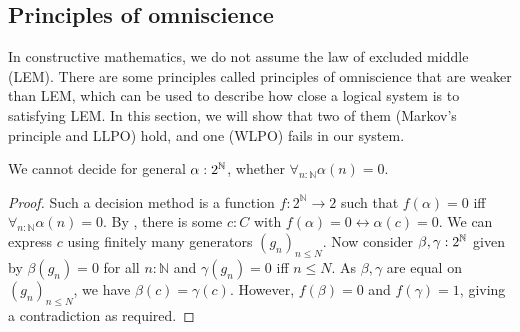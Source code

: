 \subsection{Principles of omniscience}
In constructive mathematics, we do not assume the law of excluded middle (LEM).
There are some principles called principles of omniscience that are weaker than LEM, which can be used to describe 
how close a logical system is to satisfying LEM.
In this section, we will show that two of them (Markov's principle and LLPO) hold, 
and one (WLPO) fails in our system.

\begin{theorem}\label{NotWLPO}
  We cannot decide for general $\alpha:2^{\mathbb{N}}$, whether $\forall_{n:\mathbb N} \alpha(n) = 0$.
\end{theorem}
\begin{proof}
  Such a decision method is a function $f:2^\mathbb N \to 2$ such that 
  $f(\alpha) = 0$ iff $\forall_{n:\mathbb N} \alpha (n)= 0$. 
  By , there is some $c:C$ with 
  $f(\alpha) = 0 \leftrightarrow \alpha(c) = 0$. 
  We can express $c$ using finitely many generators $(g_n)_{n\leq N}$. 
  Now consider $\beta,\gamma:2^{\mathbb{N}}$ given by 
  $\beta(g_n) = 0$ for all $n:\mathbb N$ and
  $\gamma(g_n) = 0$ iff $n\leq N$. 
  As $\beta, \gamma$ are equal on $(g_n)_{n\leq N}$, we have $\beta(c) = \gamma(c)$. 
  However, $f(\beta) = 0$ and $f(\gamma) = 1$, giving a contradiction as required. 
\end{proof}


